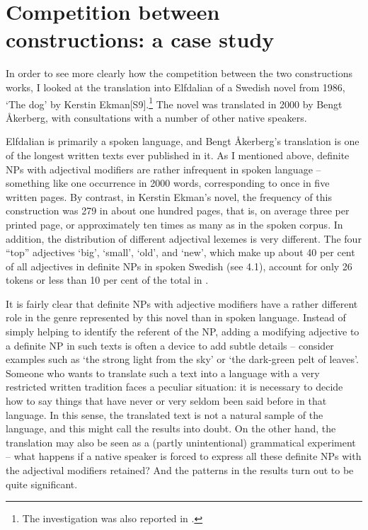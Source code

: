 \section{Competition between constructions: a case study}

In order to see more clearly how the competition between the two constructions works, I looked at the translation into Elfdalian of a Swedish novel from 1986,  ‘The dog’ by Kerstin Ekman[S9].\footnote{ The investigation was also reported in \citet{Dahl2004}.} The novel was translated in 2000 by Bengt Åkerberg, with consultations with a number of other native speakers. 


Elfdalian is primarily a spoken language, and Bengt Åkerberg’s translation is one of the longest written texts ever published in it. As I mentioned above, definite NPs with adjectival modifiers are rather infrequent in spoken language – something like one occurrence in 2000 words, corresponding to once in five written pages. By contrast, in Kerstin Ekman’s novel, the frequency of this construction was 279 in about one hundred pages, that is, on average three per printed page, or approximately ten times as many as in the spoken corpus. In addition, the distribution of different adjectival lexemes is very different. The four “top” adjectives ‘big’,  ‘small’,  ‘old’, and  ‘new’, which make up about 40 per cent of all adjectives in definite NPs in spoken Swedish (see 4.1), account for only 26 tokens or less than 10 per cent of the total in .


It is fairly clear that definite NPs with adjective modifiers have a rather different role in the genre represented by this novel than in spoken language. Instead of simply helping to identify the referent of the NP, adding a modifying adjective to a definite NP in such texts is often a device to add subtle details – consider examples such as  ‘the strong light from the sky’ or  ‘the dark-green pelt of leaves’. Someone who wants to translate such a text into a language with a very restricted written tradition faces a peculiar situation: it is necessary to decide how to say things that have never or very seldom been said before in that language. In this sense, the translated text is not a natural sample of the language, and this might call the results into doubt. On the other hand, the translation may also be seen as a (partly unintentional) grammatical experiment – what happens if a native speaker is forced to express all these definite NPs with the adjectival modifiers retained? And the patterns in the results turn out to be quite significant.

